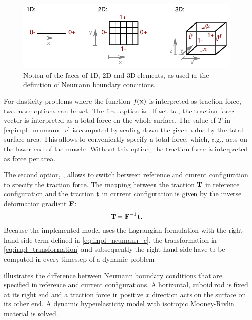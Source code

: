 \begin{figure}
  \centering%
  \includegraphics[width=\textwidth]{images/implementation/faces.pdf}%
  \caption{Notion of the faces of 1D, 2D and 3D elements, as used in the definition of Neumann boundary conditions.}%
  \label{fig:faces}%
\end{figure}%

For elasticity problems where the function $f(\textbf{x})$ is interpreted as traction force, two more options can be set.
The first option is . If set to , the traction force vector is interpreted as a total force on the whole surface. The value of $T$ in \cref{eq:impl_neumann_c} is computed by scaling down the given value by the total surface area. This allows to conveniently specify a total force, which, e.g., acts on the lower end of the muscle. Without this option, the traction force is interpreted as force per area.

The second option, , allows to switch between reference and current configuration to specify the traction force. The mapping between the traction $\textbf{T}$ in reference configuration and the traction $\textbf{t}$ in current configuration is given by the inverse deformation gradient $\textbf{F}$:%
\begin{align}\label{eq:impl_transformation}
  \textbf{T} = \textbf{F}^{-1}\,\textbf{t}.
\end{align}
Because the implemented model uses the Lagrangian formulation with the right hand side term defined in \cref{eq:impl_neumann_c}, the transformation in \cref{eq:impl_transformation} and subsequently the right hand side have to be computed in every timestep of a dynamic problem.

 illustrates the difference between Neumann boundary conditions that are specified in reference and current configurations. A horizontal, cuboid rod is fixed at its right end and a traction force in positive $x$ direction acts on the surface on its other end.
A dynamic hyperelasticity model with isotropic Mooney-Rivlin material is solved.

